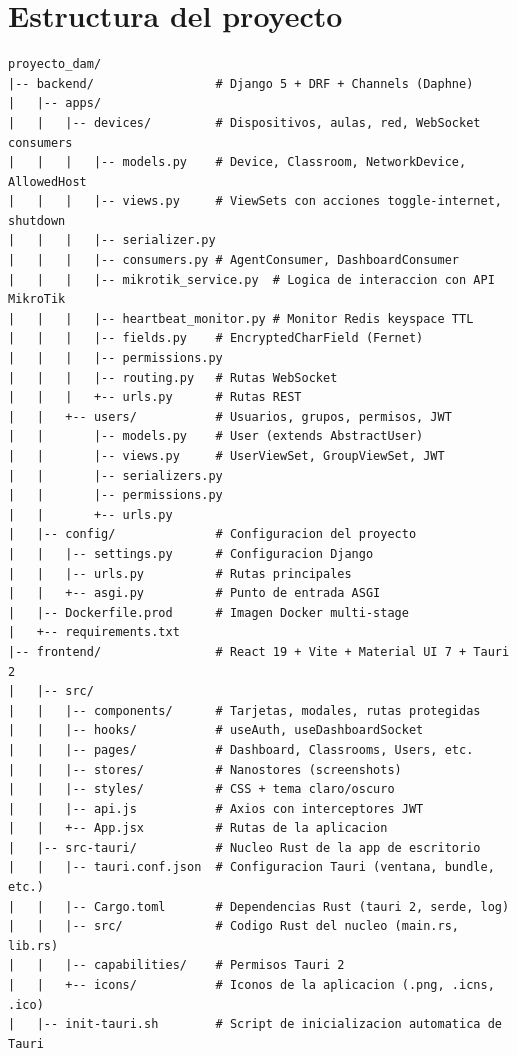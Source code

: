 \documentclass[12pt, a4paper, twoside]{article}
\begin{document}
\newpage
\section{Estructura del proyecto}

\begin{lstlisting}[language={}, caption={Estructura de directorios del proyecto.}]
proyecto_dam/
|-- backend/                 # Django 5 + DRF + Channels (Daphne)
|   |-- apps/
|   |   |-- devices/         # Dispositivos, aulas, red, WebSocket consumers
|   |   |   |-- models.py    # Device, Classroom, NetworkDevice, AllowedHost
|   |   |   |-- views.py     # ViewSets con acciones toggle-internet, shutdown
|   |   |   |-- serializer.py
|   |   |   |-- consumers.py # AgentConsumer, DashboardConsumer
|   |   |   |-- mikrotik_service.py  # Logica de interaccion con API MikroTik
|   |   |   |-- heartbeat_monitor.py # Monitor Redis keyspace TTL
|   |   |   |-- fields.py    # EncryptedCharField (Fernet)
|   |   |   |-- permissions.py
|   |   |   |-- routing.py   # Rutas WebSocket
|   |   |   +-- urls.py      # Rutas REST
|   |   +-- users/           # Usuarios, grupos, permisos, JWT
|   |       |-- models.py    # User (extends AbstractUser)
|   |       |-- views.py     # UserViewSet, GroupViewSet, JWT
|   |       |-- serializers.py
|   |       |-- permissions.py
|   |       +-- urls.py
|   |-- config/              # Configuracion del proyecto
|   |   |-- settings.py      # Configuracion Django
|   |   |-- urls.py          # Rutas principales
|   |   +-- asgi.py          # Punto de entrada ASGI
|   |-- Dockerfile.prod      # Imagen Docker multi-stage
|   +-- requirements.txt
|-- frontend/                # React 19 + Vite + Material UI 7 + Tauri 2
|   |-- src/
|   |   |-- components/      # Tarjetas, modales, rutas protegidas
|   |   |-- hooks/           # useAuth, useDashboardSocket
|   |   |-- pages/           # Dashboard, Classrooms, Users, etc.
|   |   |-- stores/          # Nanostores (screenshots)
|   |   |-- styles/          # CSS + tema claro/oscuro
|   |   |-- api.js           # Axios con interceptores JWT
|   |   +-- App.jsx          # Rutas de la aplicacion
|   |-- src-tauri/           # Nucleo Rust de la app de escritorio
|   |   |-- tauri.conf.json  # Configuracion Tauri (ventana, bundle, etc.)
|   |   |-- Cargo.toml       # Dependencias Rust (tauri 2, serde, log)
|   |   |-- src/             # Codigo Rust del nucleo (main.rs, lib.rs)
|   |   |-- capabilities/    # Permisos Tauri 2
|   |   +-- icons/           # Iconos de la aplicacion (.png, .icns, .ico)
|   |-- init-tauri.sh        # Script de inicializacion automatica de Tauri

\end{lstlisting}
\end{document}
